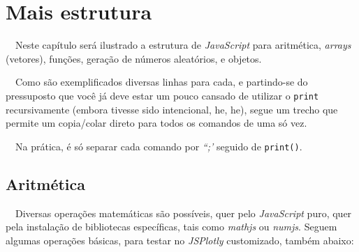 \documentclass[
  portuguese,
  letterpaper,
  DIV=11,
  numbers=noendperiod]{scrreprt}
\begin{document}

\chapter{Mais estrutura}\label{mais-estrutura}

~~Neste capítulo será ilustrado a estrutura de \emph{JavaScript} para
aritmética, \emph{arrays} (vetores), funções, geração de números
aleatórios, e objetos.

~~Como são exemplificados diversas linhas para cada, e partindo-se do
pressuposto que você já deve estar um pouco cansado de utilizar o
\texttt{print} recursivamente (embora tivesse sido intencional, he, he),
segue um trecho que permite um copia/colar direto para todos os comandos
de uma só vez.

~~Na prática, é só separar cada comando por \emph{``;'} seguido de
\texttt{print()}.

\hfill\break

\section{Aritmética}\label{aritmuxe9tica}

~~Diversas operações matemáticas são possíveis, quer pelo
\emph{JavaScript} puro, quer pela instalação de bibliotecas específicas,
tais como \emph{mathjs} ou \emph{numjs}. Seguem algumas operações
básicas, para testar no \emph{JSPlotly} customizado, também abaixo:
\end{document}
